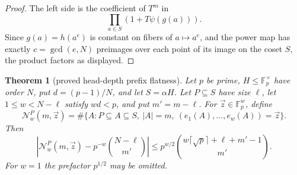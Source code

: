 \documentclass[a4paper,11pt]{amsart}
\newtheorem{theorem}{Theorem}[section]
\theoremstyle{remark}
\newcommand{\F}{\mathbb F}
\begin{document}
\begin{proof}
The left side is the coefficient of \(T^m\) in
\[
        \prod_{a\in S}(1+T\psi(g(a))).
\]
Since \(g(a)=h(a^e)\) is constant on fibers of \(a\mapsto a^e\), and the power map has exactly \(c=\gcd(e,N)\) preimages over each point of its image on the coset \(S\), the product factors as displayed.
\end{proof}

\begin{theorem}[proved head-depth prefix flatness]\label{thm:head-flatness}
Let \(p\) be prime, \(H\le\F_p^\times\) have order \(N\), put \(d=(p-1)/N\), and let \(S=\alpha H\).  Let \(P\subseteq S\) have size \(\ell\), let \(1\le w<N-\ell\) satisfy \(wd<p\), and put \(m'=m-\ell\).  For \(\vec z\in\F_p^w\), define
\[
        \mathcal N_w^P(m,\vec z)=
        \#\{A:P\subseteq A\subseteq S,\ |A|=m,\ (e_1(A),\ldots,e_w(A))=\vec z\}.
\]
Then
\[
        \left|\mathcal N_w^P(m,\vec z)-p^{-w}\binom{N-\ell}{m'}\right|
        \le
        p^{w/2}\binom{w\lceil\sqrt p\rceil+\ell+m'-1}{m'} .
\]
For \(w=1\) the prefactor \(p^{1/2}\) may be omitted.
\end{theorem}
\end{document}
